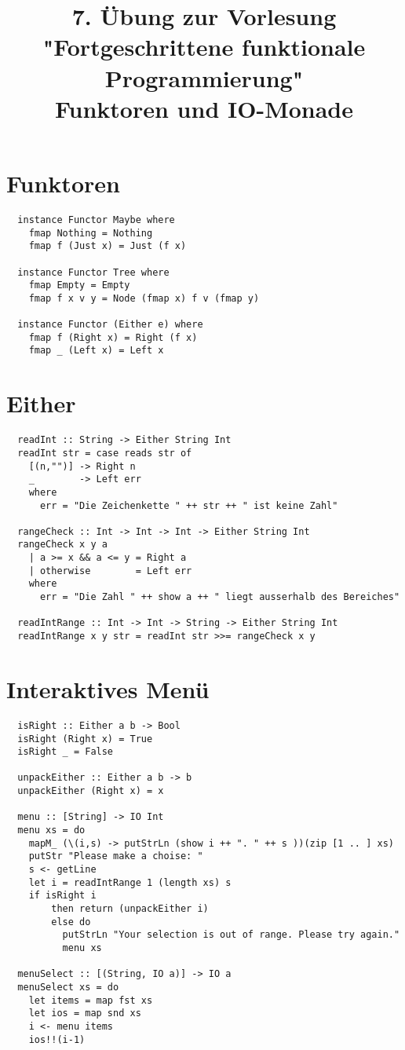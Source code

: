 \documentclass[a4paper]{article}
\title{\small{7. Übung zur Vorlesung "Fortgeschrittene funktionale Programmierung"}\\\vspace{.5cm}\huge{Funktoren und IO-Monade}}
\begin{document}
\maketitle

\section{Funktoren}
\begin{lstlisting}
  instance Functor Maybe where
    fmap Nothing = Nothing
    fmap f (Just x) = Just (f x)

  instance Functor Tree where
    fmap Empty = Empty
    fmap f x v y = Node (fmap x) f v (fmap y)

  instance Functor (Either e) where
    fmap f (Right x) = Right (f x)
    fmap _ (Left x) = Left x

\end{lstlisting}


\section{Either}
\begin{lstlisting}
  readInt :: String -> Either String Int
  readInt str = case reads str of
    [(n,"")] -> Right n
    _        -> Left err
    where
      err = "Die Zeichenkette " ++ str ++ " ist keine Zahl"

  rangeCheck :: Int -> Int -> Int -> Either String Int
  rangeCheck x y a
    | a >= x && a <= y = Right a
    | otherwise        = Left err
    where
      err = "Die Zahl " ++ show a ++ " liegt ausserhalb des Bereiches"

  readIntRange :: Int -> Int -> String -> Either String Int
  readIntRange x y str = readInt str >>= rangeCheck x y
\end{lstlisting}

\pagebreak

\section{Interaktives Menü}
\begin{lstlisting}
  isRight :: Either a b -> Bool
  isRight (Right x) = True
  isRight _ = False

  unpackEither :: Either a b -> b
  unpackEither (Right x) = x

  menu :: [String] -> IO Int
  menu xs = do
    mapM_ (\(i,s) -> putStrLn (show i ++ ". " ++ s ))(zip [1 .. ] xs)
    putStr "Please make a choise: "
    s <- getLine
    let i = readIntRange 1 (length xs) s
    if isRight i
        then return (unpackEither i)
        else do
          putStrLn "Your selection is out of range. Please try again."
          menu xs

  menuSelect :: [(String, IO a)] -> IO a
  menuSelect xs = do
    let items = map fst xs
    let ios = map snd xs
    i <- menu items
    ios!!(i-1)
\end{lstlisting}
\end{document}
